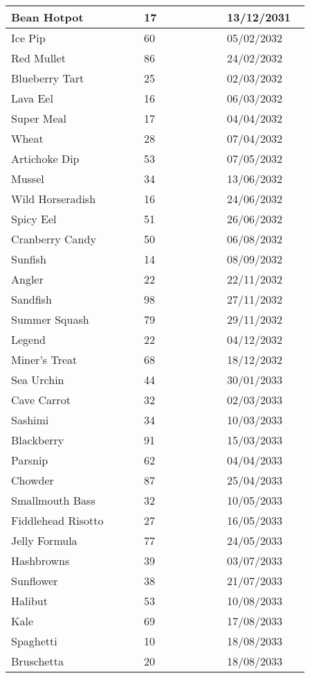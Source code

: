 \documentclass{article}
\begin{document}
\begin{longtable}{|p{0.4\linewidth}|p{0.25\linewidth}|p{0.25\linewidth}|}
\hline
Bean Hotpot & 17 & 13/12/2031 \\
\hline
Ice Pip & 60 & 05/02/2032 \\
\hline
Red Mullet & 86 & 24/02/2032 \\
\hline
Blueberry Tart & 25 & 02/03/2032 \\
\hline
Lava Eel & 16 & 06/03/2032 \\
\hline
Super Meal & 17 & 04/04/2032 \\
\hline
Wheat & 28 & 07/04/2032 \\
\hline
Artichoke Dip & 53 & 07/05/2032 \\
\hline
Mussel & 34 & 13/06/2032 \\
\hline
Wild Horseradish & 16 & 24/06/2032 \\
\hline
Spicy Eel & 51 & 26/06/2032 \\
\hline
Cranberry Candy & 50 & 06/08/2032 \\
\hline
Sunfish & 14 & 08/09/2032 \\
\hline
Angler & 22 & 22/11/2032 \\
\hline
Sandfish & 98 & 27/11/2032 \\
\hline
Summer Squash & 79 & 29/11/2032 \\
\hline
Legend & 22 & 04/12/2032 \\
\hline
Miner's Treat & 68 & 18/12/2032 \\
\hline
Sea Urchin & 44 & 30/01/2033 \\
\hline
Cave Carrot & 32 & 02/03/2033 \\
\hline
Sashimi & 34 & 10/03/2033 \\
\hline
Blackberry & 91 & 15/03/2033 \\
\hline
Parsnip & 62 & 04/04/2033 \\
\hline
Chowder & 87 & 25/04/2033 \\
\hline
Smallmouth Bass & 32 & 10/05/2033 \\
\hline
Fiddlehead Risotto & 27 & 16/05/2033 \\
\hline
Jelly Formula & 77 & 24/05/2033 \\
\hline
Hashbrowns & 39 & 03/07/2033 \\
\hline
Sunflower & 38 & 21/07/2033 \\
\hline
Halibut & 53 & 10/08/2033 \\
\hline
Kale & 69 & 17/08/2033 \\
\hline
Spaghetti & 10 & 18/08/2033 \\
\hline
Bruschetta & 20 & 18/08/2033 \\

\end{longtable}
\end{document}
